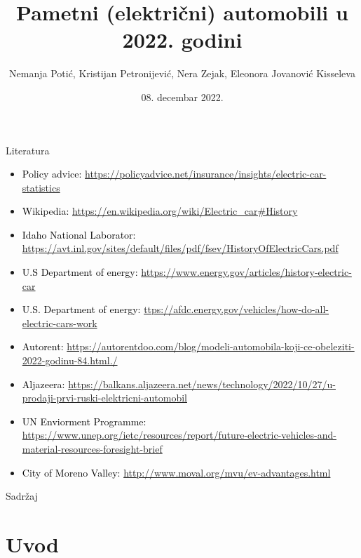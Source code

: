 \documentclass[11pt]{beamer}
\author{Nemanja Potić, Kristijan Petronijević, Nera Zejak, Eleonora Jovanović Kisseleva}
\title{Pametni (električni) automobili u 2022. godini}
\institute[]{Matematički fakultet Univertziteta u Beogradu}
\date{08. decembar 2022.}
\begin{document}
\begin{frame}
\titlepage
\end{frame}

\begin{frame}{Literatura}
\begin{itemize}

\item \textcolor{black}{{\footnotesize Policy advice:}} {\footnotesize \url{ https://policyadvice.net/insurance/insights/electric-car-statistics}}
\item \textcolor{black}{{\footnotesize Wikipedia:}} {\footnotesize \url{ https://en.wikipedia.org/wiki/Electric_car#History}}
\item \textcolor{black}{{\footnotesize Idaho National Laborator:}} {\footnotesize \url{  https://avt.inl.gov/sites/default/files/pdf/fsev/HistoryOfElectricCars.pdf}}
\item \textcolor{black}{{\footnotesize U.S Department of energy:}} {\footnotesize \url{  https://www.energy.gov/articles/history-electric-car}}
\item \textcolor{black}{{\footnotesize U.S. Department of energy:}} {\footnotesize \url{ttps://afdc.energy.gov/vehicles/how-do-all-electric-cars-work }}
\item \textcolor{black}{{\footnotesize Autorent:}} {\footnotesize \url{ https://autorentdoo.com/blog/modeli-automobila-koji-ce-obeleziti-2022-godinu-84.html./}}
\item \textcolor{black}{{\footnotesize Aljazeera:}} {\footnotesize \url{ https://balkans.aljazeera.net/news/technology/2022/10/27/u-prodaji-prvi-ruski-elektricni-automobil}}
\item \textcolor{black}{{\footnotesize UN Enviorment Programme:}} {\footnotesize \url{ https://www.unep.org/ietc/resources/report/future-electric-vehicles-and-material-resources-foresight-brief}}
\item \textcolor{black}{{\footnotesize City of Moreno Valley:}} {\footnotesize \url{ http://www.moval.org/mvu/ev-advantages.html}}
\end{itemize}
\end{frame}

\begin{frame}{Sadržaj}
\tableofcontents 
\end{frame}

\section{Uvod}
\end{document}
